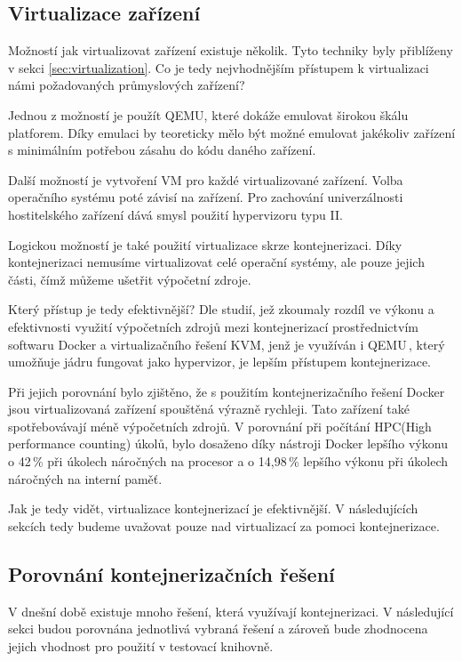 \subsection{Virtualizace zařízení}

Možností jak virtualizovat zařízení existuje několik. Tyto techniky byly přiblíženy v sekci \ref{sec:virtualization}. Co je tedy nejvhodnějším přístupem k virtualizaci námi požadovaných průmyslových zařízení? 

Jednou z možností je použít QEMU, které dokáže emulovat širokou škálu platforem. Díky emulaci by teoreticky mělo být možné emulovat jakékoliv zařízení s minimálním potřebou zásahu do kódu daného zařízení. 

Další možností je vytvoření VM pro každé virtualizované zařízení. Volba operačního systému poté závisí na zařízení. Pro zachování univerzálnosti hostitelského zařízení dává smysl použití hypervizoru typu II.

Logickou možností je také použití virtualizace skrze kontejnerizaci. Díky kontejnerizaci nemusíme virtualizovat celé operační systémy, ale pouze jejich části, čímž můžeme ušetřit výpočetní zdroje.

Který přístup je tedy efektivnější? Dle studií, jež zkoumaly rozdíl ve výkonu a efektivnosti využití výpočetních zdrojů mezi kontejnerizací prostřednictvím softwaru Docker a virtualizačního řešení KVM, jenž je využíván i QEMU\,\cite{qemu_kvm}, který umožňuje jádru fungovat jako hypervizor, je lepším přístupem kontejnerizace. 

Při jejich porovnání bylo zjištěno, že s použitím kontejnerizačního řešení Docker jsou virtualizovaná zařízení spouštěná výrazně rychleji. Tato zařízení také spotřebovávají méně výpočetních zdrojů. V porovnání při počítání HPC(High performance counting) úkolů, bylo dosaženo díky nástroji Docker lepšího výkonu o 42\,\% při úkolech náročných na procesor a o 14,98\,\% lepšího výkonu při úkolech náročných na interní paměť.\,\cite{kvmdockercomp}\cite{2021virt} 

Jak je tedy vidět, virtualizace kontejnerizací je efektivnější. V následujících sekcích tedy budeme uvažovat pouze nad virtualizací za pomoci kontejnerizace. 

\subsection{Porovnání kontejnerizačních řešení}

V dnešní době existuje mnoho řešení, která využívají kontejnerizaci. V následující sekci budou porovnána jednotlivá vybraná řešení a zároveň bude zhodnocena jejich vhodnost pro použití v testovací knihovně. 

